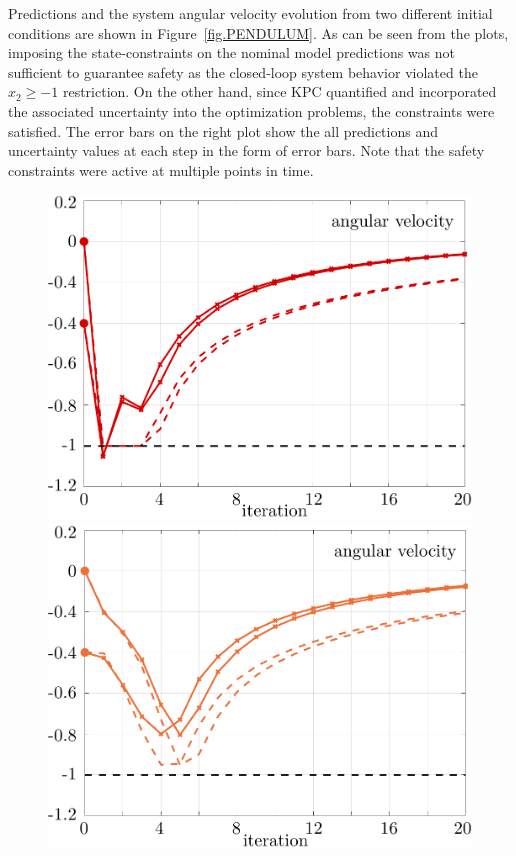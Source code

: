 Predictions and the system angular velocity evolution from two different initial conditions are shown in Figure~\ref{fig.PENDULUM}. As can be seen from the plots, imposing the state-constraints on the nominal model predictions was not sufficient to guarantee safety as the closed-loop system behavior violated the $x_2 \geq -1$ restriction. On the other hand, since KPC quantified and incorporated the associated uncertainty into the optimization problems, the constraints were satisfied. The error bars on the right plot show the all predictions and uncertainty values at each step in the form of error bars. Note that the safety constraints were active at multiple points in time. 

\begin{figure}[t]
	\centering
	\includegraphics[scale=0.25]{../images/chap2_numex_ex4_A.pdf}
	\includegraphics[scale=0.25]{../images/chap2_numex_ex4_B.pdf}

\end{figure}
